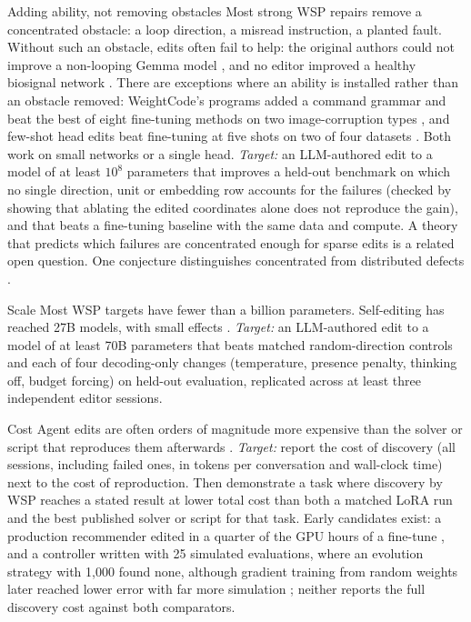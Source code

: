 \begin{openproblem}{Adding ability, not removing obstacles}\label{op:ability}
Most strong WSP repairs remove a concentrated obstacle: a loop direction, a misread instruction, a planted fault. Without such an obstacle, edits often fail to help: the original authors could not improve a non-looping Gemma model \citep{takehi2026sparks}, and no editor improved a healthy biosignal network \citep{ax2611_13758}. There are exceptions where an ability is installed rather than an obstacle removed: WeightCode's programs added a command grammar and beat the best of eight fine-tuning methods on two image-corruption types \citep{ax2611_25476}, and few-shot head edits beat fine-tuning at five shots on two of four datasets \citep{ax2611_28105}. Both work on small networks or a single head. \emph{Target:} an LLM-authored edit to a model of at least $10^{8}$ parameters that improves a held-out benchmark on which no single direction, unit or embedding row accounts for the failures (checked by showing that ablating the edited coordinates alone does not reproduce the gain), and that beats a fine-tuning baseline with the same data and compute. A theory that predicts which failures are concentrated enough for sparse edits is a related open question. One conjecture distinguishes concentrated from distributed defects \citep{ax2611_04268}.
\end{openproblem}

\begin{openproblem}{Scale}\label{op:scale}
Most WSP targets have fewer than a billion parameters. Self-editing has reached 27B models, with small effects \citep{ax2611_21885,ax2611_29513,ax2611_31117}. \emph{Target:} an LLM-authored edit to a model of at least 70B parameters that beats matched random-direction controls and each of four decoding-only changes (temperature, presence penalty, thinking off, budget forcing) on held-out evaluation, replicated across at least three independent editor sessions.
\end{openproblem}

\begin{openproblem}{Cost}\label{op:cost}
Agent edits are often orders of magnitude more expensive than the solver or script that reproduces them afterwards \citep{ax2611_14210,zen23954378}. \emph{Target:} report the cost of discovery (all sessions, including failed ones, in tokens per conversation and wall-clock time) next to the cost of reproduction. Then demonstrate a task where discovery by WSP reaches a stated result at lower total cost than both a matched LoRA run and the best published solver or script for that task. Early candidates exist: a production recommender edited in a quarter of the GPU hours of a fine-tune \citep{ax2611_29613}, and a controller written with 25 simulated evaluations, where an evolution strategy with 1{,}000 found none, although gradient training from random weights later reached lower error with far more simulation \citep{ax2611_21958}; neither reports the full discovery cost against both comparators.
\end{openproblem}

